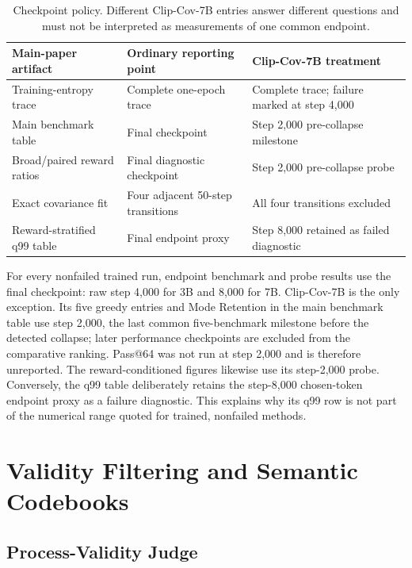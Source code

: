 \documentclass[letterpaper]{article}
\begin{document}
\begin{table}[t]
\centering
\small
\setlength{\tabcolsep}{4pt}
\begin{tabular*}{\textwidth}{@{\extracolsep{\fill}}lll}
\toprule
Main-paper artifact & Ordinary reporting point & Clip-Cov-7B treatment\\
\midrule
Training-entropy trace & Complete one-epoch trace & Complete trace; failure marked at step 4,000\\
Main benchmark table & Final checkpoint & Step 2,000 pre-collapse milestone\\
Broad/paired reward ratios & Final diagnostic checkpoint & Step 2,000 pre-collapse probe\\
Exact covariance fit & Four adjacent 50-step transitions & All four transitions excluded\\
Reward-stratified q99 table & Final endpoint proxy & Step 8,000 retained as failed diagnostic\\
\bottomrule
\end{tabular*}
\caption{Checkpoint policy.  Different Clip-Cov-7B entries answer different
questions and must not be interpreted as measurements of one common endpoint.}
\label{tab:sup-checkpoints}
\end{table}

For every nonfailed trained run, endpoint benchmark and probe results use the
final checkpoint: raw step 4,000 for 3B and 8,000 for 7B.  Clip-Cov-7B is the
only exception.  Its five greedy entries and Mode Retention in the main
benchmark table use step 2,000, the last common five-benchmark milestone before
the detected collapse; later performance checkpoints are excluded from the
comparative ranking.  Pass@64 was not run at step 2,000 and is therefore
unreported.  The reward-conditioned figures likewise use its step-2,000
probe.  Conversely, the q99 table deliberately retains the step-8,000
chosen-token endpoint proxy as a failure diagnostic.  This explains why its
q99 row is not part of the numerical range quoted for trained, nonfailed
methods.

\section{Validity Filtering and Semantic Codebooks}

\subsection{Process-Validity Judge}
\end{document}
